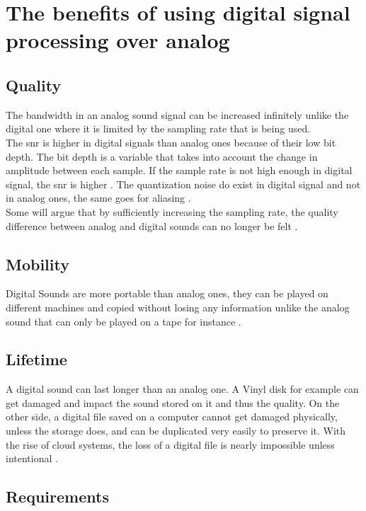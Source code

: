 \section{The benefits of using digital signal processing over analog}
\subsection{Quality}

The bandwidth in an analog sound signal can be increased infinitely unlike the digital one where it is limited by the sampling rate that is being used. \\
The \gls{snr} is higher in digital signals than analog ones because of their low bit depth. The bit depth is a variable that takes into account the change in amplitude between each sample. If the sample rate is not high enough in digital signal, the \gls{snr} is higher \citep{analog_quality}. The quantization noise do exist in digital signal and not in analog ones, the same goes for aliasing \citep{analog_aliasing}. \\
Some will argue that by sufficiently increasing the sampling rate, the quality difference between analog and digital sounds can no longer be felt \citep{analog_storage}.

\subsection{Mobility}

Digital Sounds are more portable than analog ones, they can be played on different machines and copied without losing any information unlike the analog sound that can only be played on a tape for instance \citep{analog_quality}. 

\subsection{Lifetime}

A digital sound can last longer than an analog one. A Vinyl disk for example can get damaged and impact the sound stored on it and thus the quality. On the other side, a digital file saved on a computer cannot get damaged physically, unless the storage does, and can be duplicated very easily to preserve it. With the rise of cloud systems, the loss of a digital file is nearly impossible unless intentional \citep{analog_storage}.


\subsection{Requirements}

